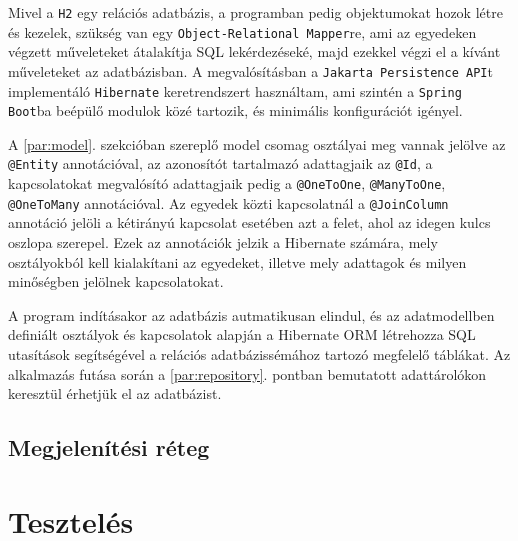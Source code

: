 Mivel a \texttt{H2} egy relációs adatbázis, a programban pedig objektumokat hozok létre és kezelek, szükség van egy \texttt{Object-Relational Mapper}re, ami az egyedeken végzett műveleteket átalakítja SQL lekérdezéseké, majd ezekkel végzi el a kívánt műveleteket az adatbázisban. A megvalósításban a \texttt{Jakarta Persistence API}t implementáló \texttt{Hibernate} keretrendszert használtam, ami szintén a \texttt{Spring Boot}ba beépülő modulok közé tartozik, és minimális konfigurációt igényel.

A \ref{par:model}. szekcióban szereplő model csomag osztályai meg vannak jelölve az \texttt{@Entity} annotációval, az azonosítót tartalmazó adattagjaik az \texttt{@Id}, a kapcsolatokat megvalósító adattagjaik pedig a \texttt{@OneToOne}, \texttt{@ManyToOne}, \texttt{@OneToMany} annotációval. Az egyedek közti kapcsolatnál a \texttt{@JoinColumn}  annotáció jelöli a kétirányú kapcsolat esetében azt a felet, ahol az idegen kulcs oszlopa szerepel. Ezek az annotációk jelzik a Hibernate számára, mely osztályokból kell kialakítani az egyedeket, illetve mely adattagok és milyen minőségben jelölnek kapcsolatokat.

A program indításakor az adatbázis autmatikusan elindul, és az adatmodellben definiált osztályok és kapcsolatok alapján a Hibernate ORM létrehozza SQL utasítások segítségével a relációs adatbázissémához tartozó megfelelő táblákat. Az alkalmazás futása során a \ref{par:repository}. pontban bemutatott adattárolókon keresztül érhetjük el az adatbázist.

\subsection{Megjelenítési réteg}
 

\section{Tesztelés}
